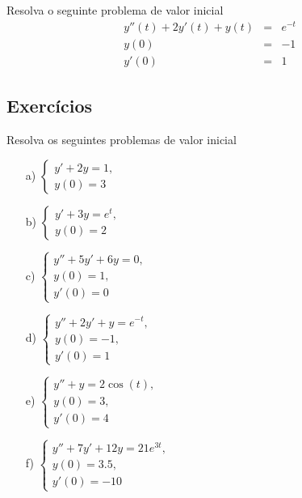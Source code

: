 \begin{exer}Resolva o seguinte problema de valor inicial
\begin{eqnarray*}
 y''(t)+2y'(t)+y(t)&=&e^{-t}\\
y(0)&=&-1\\
y'(0)&=&1
\end{eqnarray*}
\end{exer}

\subsection*{Exercícios}
\begin{exer} Resolva os seguintes problemas de valor inicial
 \begin{itemize}
  \item[a)] $\displaystyle \left\{\begin{array}{l}y'+2y=1,\\ y(0)=3 \end{array}\right.$
    \item[b)] $\displaystyle \left\{\begin{array}{l}y'+3y=e^t,\\ y(0)=2 \end{array}\right.$
    \item[c)] $\displaystyle \left\{\begin{array}{l}y''+5y'+6y=0,\\ y(0)=1,\\ y'(0)=0 \end{array}\right.$
    \item[d)] $\displaystyle \left\{\begin{array}{l}y''+2y'+y=e^{-t},\\ y(0)=-1,\\ y'(0)=1 \end{array}\right.$
    \item[e)] $\displaystyle \left\{\begin{array}{l}y'' +  y = 2 \cos(t),\\ y(0)=3,\\ y'(0)=4 \end{array}\right.$
    \item[f)] $\displaystyle \left\{\begin{array}{l}y'' +7 y' +12 y = 21 e^{3t},\\ y(0)=3.5, \\ y'(0)=-10 \end{array}\right.$
 \end{itemize}
\end{exer}
